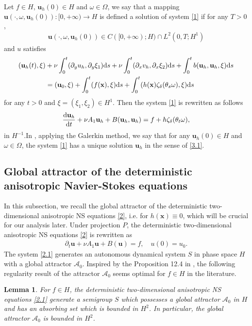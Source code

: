 \documentclass{elsarticle}
\newtheorem{lemma}[theorem]{Lemma}
\theoremstyle{definition}
\numberwithin{equation}{section}
\newcommand{\A}{\mathcal{A}}
\renewcommand{\d}{{\rm{d}}}
\begin{document}
Let $f\in H$, $\textbf{u}_{h}(0)\in H$ and $\omega\in\Omega$, we say that a mapping $\textbf{u}(\cdot,\omega,\textbf{u}_h(0)):[0,+\infty)\rightarrow H$ is defined  a solution of system \eqref{1} if for any $T>0$,
\begin{align*}
\textbf{u}(\cdot,\omega,\textbf{u}_h(0))\in C([0,+\infty);H)\cap L^2(0,T;H^1)
\end{align*}
and $u$ satisfies
\begin{align}\label{3.1}
(\textbf{u}_h(t),\xi)&+\nu\int_0^t(\partial_yu_h,\partial_y\xi_1)\d s+\nu\int_0^t(\partial_xv_h,\partial_x\xi_2)\d s+\int_0^tb(\textbf{u}_h,\textbf{u}_h,\xi)\d s\nonumber\\
&=(\textbf{u}_0,\xi)+\int_0^t( f(\textbf{x}),\xi)\d s+\int_0^t(h(\textbf{x})\zeta_{\delta}(\theta_s\omega),\xi)\d s
\end{align}
for any $t>0$ and $\xi=(\xi_1,\xi_2)\in H^1$. Then the system \eqref{1} is rewritten as follows
\begin{align}\label{3.2}
\frac{\d \textbf{u}_h}{\d t}+\nu
A_1\textbf{u}_h+B(\textbf{u}_h,\textbf{u}_h)=f+h\zeta_{\delta}(\theta_t\omega),
\end{align}
in $H^{-1}$.In \cite{temam1,temam}, applying the Galerkin method, we say that for any $\textbf{u}_h(0)\in H$ and $\omega\in\Omega$, the system \eqref{1} has a unique solution $\textbf{u}_h$ in the sense of \eqref{3.1}.


\subsection{Global attractor of the deterministic anisotropic Navier-Stokes equations}

In this subsection, we recall the global attractor of the deterministic two-dimensional anisotropic  NS equations \eqref{2}, i.e. for $h(\textbf{x})\equiv 0$,  which will be crucial for our analysis later. Under projection $P$, the      deterministic two-dimensional anisotropic  NS equations \eqref{2}  is rewritten as
 \begin{align}\label{2.1}
   \partial_t\textbf{u}+ \nu A_1\textbf{u}+B(\textbf{u})  =f,\quad u(0)=u_{0}.
\end{align}
The system \eqref{2.1}  generates an autonomous dynamical system $S$ in phase space $H$ with a global attractor $\A_0$. Inspired by the Proposition 12.4 in \cite{robinson01},    the following regularity result of the attractor $\A_0$ seems  optimal for $f\in H$  in the literature.

\begin{lemma}
For $f\in H$, the deterministic two-dimensional anisotropic  NS equations \eqref{2.1}  generate a semigroup $S$ which possesses a global attractor $\A_0$ in $H$ and has an
  absorbing set which is bounded in $H^2$. In particular,    the global attractor $\A_0$   is   bounded in $H^2$.
\end{lemma}
\end{document}
